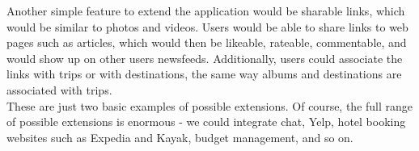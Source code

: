 \documentclass[11pt]{amsart}
\begin{document}
Another simple feature to extend the application would be sharable links, which would be similar to 
photos and videos. Users would be able to share links to web pages such as articles, which would then
be likeable, rateable, commentable, and would show up on other users newsfeeds. Additionally, users
could associate the links with trips or with destinations, the same way albums and destinations are 
associated with trips.\\

These are just two basic examples of possible extensions. Of course, the full range of possible extensions is
enormous - we could integrate chat, Yelp, hotel booking websites such as Expedia and Kayak, budget management, 
and so on.
\end{document}
